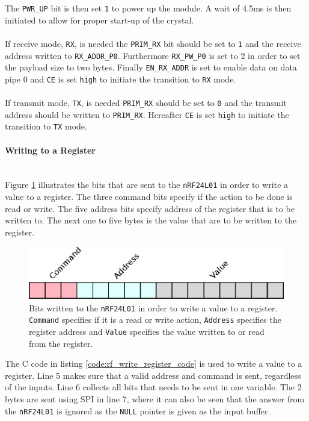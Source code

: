 The \texttt{PWR\_UP} bit is then set \texttt{1} to power up the module. 
A wait of 4.5ms is then initiated to allow for proper start-up of the crystal.
\\~\\
If receive mode, \texttt{RX}, is needed the \texttt{PRIM\_RX} bit should be set to \texttt{1} and the receive address written to \texttt{RX\_ADDR\_P0}.
Furthermore \texttt{RX\_PW\_P0} is set to 2 in order to set the payload size to two bytes.
Finally \texttt{EN\_RX\_ADDR} is set to enable data on data pipe 0 and \texttt{CE} is set \texttt{high} to initiate the transition to \texttt{RX} mode.
\\~\\
If transmit mode, \texttt{TX}, is needed \texttt{PRIM\_RX} should be set to \texttt{0} and the transmit address should be written to \texttt{PRIM\_RX}.
Hereafter \texttt{CE} is set \texttt{high} to initiate the transition to \texttt{TX} mode.

\paragraph{Writing to a Register} %
\label{par:writing_to_a_register}
~\\
Figure \ref{fig:rw_register} illustrates the bits that are sent to the \texttt{nRF24L01} in order to write a value to a register. 
The three command bits specify if the action to be done is read or write.
The five address bits specify address of the register that is to be written to. 
The next one to five bytes is the value that are to be written to the register.

\begin{figure}[!h]
	\centering
	\includegraphics[width=.5\linewidth]{graphics/rw_register.eps}
	\caption[Writing bits to a register on nRF24L01.]{Bits written to the \texttt{nRF24L01} in order to write a value to a register. \texttt{Command} specifies if it is a read or write action, \texttt{Address} specifies the register address and \texttt{Value} specifies the value written to or read from the register.}
	\label{fig:rw_register}
\end{figure}

The C code in listing \ref{code:rf_write_register_code} is used to write a value to a register. 
Line 5 makes sure that a valid address and command is sent, regardless of the inputs.
Line 6 collects all bits that needs to be sent in one variable. 
The 2 bytes are sent using SPI in line 7, where it can also be seen that the answer from the \texttt{nRF24L01} is ignored as the \texttt{NULL} pointer is given as the input buffer.  

